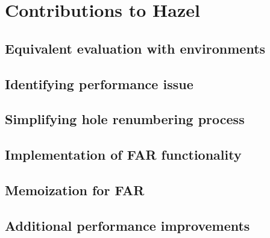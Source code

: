 \section{Contributions to Hazel}
\label{app:contributions}

\subsection{Equivalent evaluation with environments}
\label{sec:eval_with_env}

\subsection{Identifying performance issue}
\label{sec:ident_perf_issue}

\subsection{Simplifying hole renumbering process}
\label{sec:simplify_hole_renumbering}

\subsection{Implementation of FAR functionality}
\label{sec:contr_far}

\subsection{Memoization for FAR}
\label{sec:memoize_far}

\subsection{Additional performance improvements}
\label{sec:other_perf}

